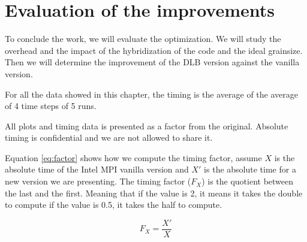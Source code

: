 \chapter{Evaluation of the improvements}

To conclude the work, we will evaluate the optimization.  We will study the overhead and the impact of the hybridization of the code and the ideal grainsize. Then we will determine the improvement of the DLB version against the vanilla version.

For all the data showed in this chapter, the timing is the average of the average of 4 time steps of 5 runs. 

\begin{tcolorbox}[colback=yellow!10!white,colframe=red!75!black,title=Important]
  All plots and timing data is presented as a factor from the original. Absolute timing is confidential and we are not allowed to share it.
\end{tcolorbox}

Equation \ref{eq:factor} shows how we compute the timing factor, assume $X$ is the absolute time of the Intel MPI vanilla version and $X'$ is the absolute time for a new version we are presenting. The timing factor ($F_X$) is the quotient between the last and the first. Meaning that if the value is 2, it means it takes the double to compute if the value is 0.5, it takes the half to compute.

\begin{equation}\label{eq:factor}
  F_X=\frac{X'}{X}
\end{equation}



%



